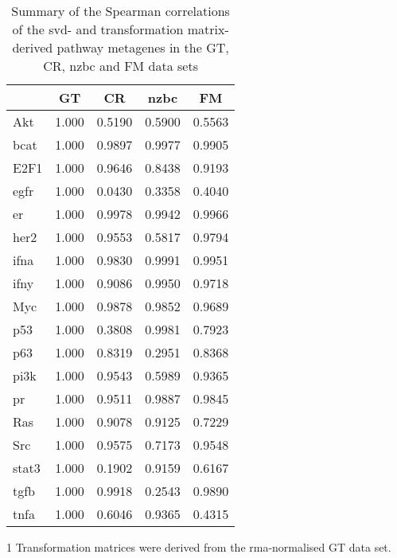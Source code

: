 \begin{table}[htpb]
	\centering
	\begin{threeparttable}
	\caption[Summary of the Spearman correlations of the \gls{svd}- and TM-derived pathway metagenes in the GT, CR, \gls{nzbc} and FM data sets]{Summary of the Spearman correlations of the \gls{svd}- and transformation matrix-derived pathway metagenes in the GT, CR, \gls{nzbc} and FM data sets}
	\label{tab:svd_vs_tm_path}
		\begin{tabular}{lcccc}
			& GT & CR & \gls{nzbc} & FM\\
			\hline
			\hline
			\rule{0pt}{2.25ex}Akt & 1.000 & 0.5190 & 0.5900 & 0.5563 \\
			\gls{bcat}            & 1.000 & 0.9897 & 0.9977 & 0.9905 \\
			E2F1                  & 1.000 & 0.9646 & 0.8438 & 0.9193 \\
			\gls{egfr}            & 1.000 & 0.0430 & 0.3358 & 0.4040 \\
			\gls{er}              & 1.000 & 0.9978 & 0.9942 & 0.9966 \\
			\gls{her2}            & 1.000 & 0.9553 & 0.5817 & 0.9794 \\
			\gls{ifna}            & 1.000 & 0.9830 & 0.9991 & 0.9951 \\
			\gls{ifny}            & 1.000 & 0.9086 & 0.9950 & 0.9718 \\
			Myc                   & 1.000 & 0.9878 & 0.9852 & 0.9689 \\
			p53                   & 1.000 & 0.3808 & 0.9981 & 0.7923 \\
			p63                   & 1.000 & 0.8319 & 0.2951 & 0.8368 \\
			\gls{pi3k}            & 1.000 & 0.9543 & 0.5989 & 0.9365 \\
			\gls{pr}              & 1.000 & 0.9511 & 0.9887 & 0.9845 \\
			Ras                   & 1.000 & 0.9078 & 0.9125 & 0.7229 \\
			Src                   & 1.000 & 0.9575 & 0.7173 & 0.9548 \\
			\gls{stat3}           & 1.000 & 0.1902 & 0.9159 & 0.6167 \\
			\gls{tgfb}            & 1.000 & 0.9918 & 0.2543 & 0.9890 \\
			\gls{tnfa}            & 1.000 & 0.6046 & 0.9365 & 0.4315 \\
			\hline
			\hline
		\end{tabular}
		\begin{tablenotes}
			\begin{footnotesize}
				\item [1] Transformation matrices were derived from the \gls{rma}-normalised GT data set.
			\end{footnotesize}
		\end{tablenotes}
	\end{threeparttable}
\end{table}

